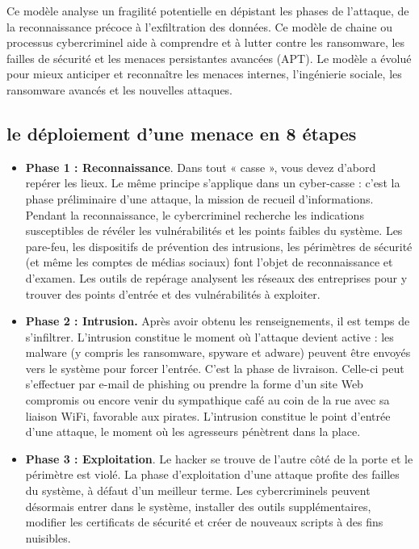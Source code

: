 Ce modèle analyse un fragilité potentielle en dépistant les phases de l’attaque, de la reconnaissance précoce à l’exfiltration des données. Ce modèle de chaine ou processus cybercriminel aide à comprendre et à lutter contre les ransomware, les failles de sécurité et les menaces persistantes avancées (APT). Le modèle a évolué pour mieux anticiper et reconnaître les menaces internes, l’ingénierie sociale, les ransomware avancés et les nouvelles attaques.

\subsection{le déploiement d'une menace en 8 étapes}


\begin{itemize}
  \item \textbf{Phase 1 : Reconnaissance}. Dans tout « casse », vous devez d’abord repérer les lieux. Le même principe s’applique dans un cyber-casse : c’est la phase préliminaire d’une attaque, la mission de recueil d’informations. Pendant la reconnaissance, le cybercriminel recherche les indications susceptibles de révéler les vulnérabilités et les points faibles du système. Les pare-feu, les dispositifs de prévention des intrusions, les périmètres de sécurité (et même les comptes de médias sociaux) font l’objet de reconnaissance et d’examen. Les outils de repérage analysent les réseaux des entreprises pour y trouver des points d’entrée et des vulnérabilités à exploiter.

 \item \textbf{Phase 2 : Intrusion.} Après avoir obtenu les renseignements, il est temps de s’infiltrer. L’intrusion constitue le moment où l’attaque devient active : les malware (y compris les ransomware, spyware et adware) peuvent être envoyés vers le système pour forcer l’entrée. C’est la phase de livraison. Celle-ci peut s’effectuer par e-mail de phishing ou prendre la forme d’un site Web compromis ou encore venir du sympathique café au coin de la rue avec sa liaison WiFi, favorable aux pirates. L’intrusion constitue le point d’entrée d’une attaque, le moment où les agresseurs pénètrent dans la place.

 \item \textbf{Phase 3 : Exploitation}. Le hacker se trouve de l’autre côté de la porte et le périmètre est violé. La phase d’exploitation d’une attaque profite des failles du système, à défaut d’un meilleur terme. Les cybercriminels peuvent désormais entrer dans le système, installer des outils supplémentaires, modifier les certificats de sécurité et créer de nouveaux scripts à des fins nuisibles.


\end{itemize}
